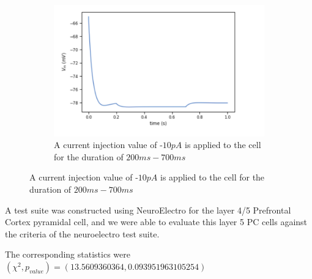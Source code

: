 \begin{figure}
\begin{center}
\begin{subfigure}{.2\textwidth}
  \centering
    \includegraphics[scale=0.5]{figures/correct_passive_l5pc.png}
    \caption{A current injection value of -$10pA$ is applied to the cell for the duration of $200ms-700ms$}
  \label{fig:sub2}
\end{subfigure}
\label{fig:test}
\end{center}
\end{figure}


A test suite was constructed using NeuroElectro for the layer 4/5 Prefrontal Cortex pyramidal cell, and we were able to evaluate this layer 5 PC cells against the criteria of the neuroelectro test suite. 

\begin{table}[ht]
\centering
{}
\end{table}
The corresponding statistics were
$(\chi^{2},p_{value})=(13.5609360364, 0.093951963105254)$

